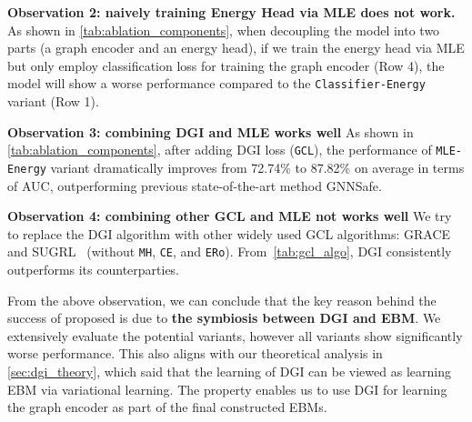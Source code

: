 \textbf{Observation 2: naively training Energy Head via MLE does not work.} 
As shown in \cref{tab:ablation_components}, when decoupling the model into two parts (a graph encoder and an energy head), if we train the energy head via MLE but only employ classification loss for training the graph encoder (Row 4), the model will show a worse performance compared to the \texttt{Classifier-Energy} variant (Row 1). 

\textbf{Observation 3: combining DGI and MLE works well} 
As shown in \cref{tab:ablation_components}, after adding DGI loss (\texttt{GCL}), the performance of \texttt{MLE-Energy} variant dramatically improves from 72.74\% to 87.82\% on average in terms of AUC, outperforming previous state-of-the-art method GNNSafe.

\textbf{Observation 4: combining other GCL and MLE not works well} 
We try to replace the DGI algorithm with other widely used GCL algorithms: GRACE~\citep{grace} and SUGRL~\citep{sugrl} (without \texttt{MH}, \texttt{CE}, and \texttt{ERo}). From~\cref{tab:gcl_algo}, DGI consistently outperforms its counterparties. 

From the above observation, we can conclude that the key reason behind the success of proposed \shortname is due to \textbf{the symbiosis between DGI and EBM}. We extensively evaluate the potential variants, however all variants show significantly worse performance. This also aligns with our theoretical analysis in \cref{sec:dgi_theory}, which said that the learning of DGI can be viewed as learning EBM via variational learning. The property enables us to use DGI for learning the graph encoder as part of the final constructed EBMs.





